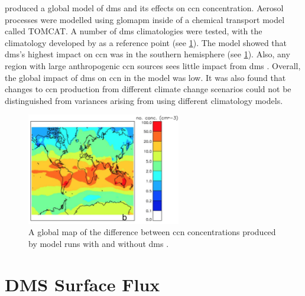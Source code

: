 	\citet{woodhouse:2010ed} produced a global model of \gls{dms} and its effects on \gls{ccn} concentration. Aerosol processes were modelled using \gls{glomapm} inside of a chemical transport model called TOMCAT. A number of \gls{dms} climatologies were tested, with the climatology developed by \citet{Kettle:2000jy} as a reference point (see \cref{sec:dmssurf}). The model showed that \gls{dms}'s highest impact on \gls{ccn} was in the southern hemisphere (see \cref{fig:wooddmsccn}). Also, any region with large anthropogenic \gls{ccn} sources sees little impact from \gls{dms} \citep{woodhouse:2010ed}. Overall, the global impact of \gls{dms} on \gls{ccn} in the model was low. It was also found that changes to \gls{ccn} production from different climate change scenarios could not be distinguished from variances arising from using different climatology models.

	\begin{figure}[!htb]
	    \centering
	    \includegraphics[width=0.6\textwidth,natwidth=1462,natheight=1060]{Fig/Literature_Review/wooddmsccn.png}
	    \caption{A global map of the difference between \gls{ccn} concentrations produced by model runs with and without \gls{dms} \citep{woodhouse:2010ed}.}
	    \label{fig:wooddmsccn}
	\end{figure}




	\section{DMS Surface Flux}
	\label{sec:dmssurf}


